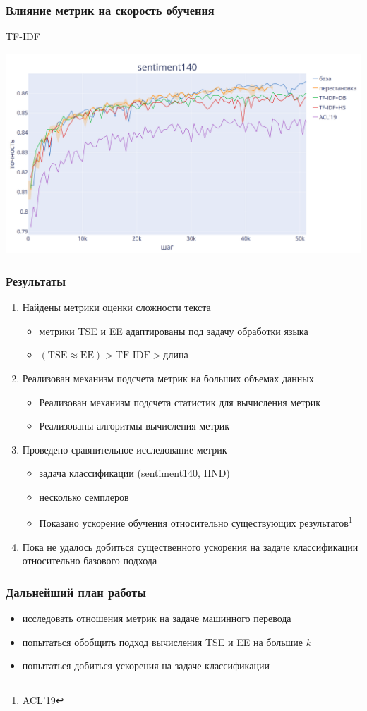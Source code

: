 \documentclass{beamer}
\begin{document}
\begin{frame}
	\frametitle{Влияние метрик на скорость обучения}
	TF-IDF
	\begin{center}
		\includegraphics[scale=0.18]{s140_tf_idf_final}
	\end{center}
\end{frame}

\begin{frame}
	\frametitle{Результаты}
	\begin{enumerate}
		\item Найдены метрики оценки сложности текста
			\begin{itemize}
				\item метрики TSE и EE адаптированы под задачу обработки языка
				\item $(\text{TSE} \approx \text{EE}) > \text{TF-IDF} > \text{длина}$
			\end{itemize}
		\item Реализован механизм подсчета метрик на больших объемах данных
			\begin{itemize}
				\item Реализован механизм подсчета статистик для вычисления метрик
				\item Реализованы алгоритмы вычисления метрик
			\end{itemize}
		\item Проведено сравнительное исследование метрик
			\begin{itemize}
				\item задача классификации (sentiment140, HND)
				\item несколько семплеров
				\item Показано ускорение обучения относительно существующих результатов\footnote[1]{ACL'19}
			\end{itemize}
		\item Пока не удалось добиться существенного ускорения на задаче классификации относительно базового подхода
	\end{enumerate}
\end{frame}

\begin{frame}
	\frametitle{Дальнейший план работы}
	\begin{itemize}
		\item исследовать отношения метрик на задаче машинного перевода
		\item попытаться обобщить подход вычисления TSE и EE на большие $k$
		\item попытаться добиться ускорения на задаче классификации
	\end{itemize}
\end{frame}
\end{document}
